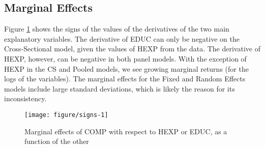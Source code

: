 \documentclass[12pt,a4paper]{article}\usepackage[]{graphicx}\usepackage[]{color}
\makeatletter
\def\maxwidth{ %
  \ifdim\Gin@nat@width>\linewidth
    \linewidth
  \else
    \Gin@nat@width
  \fi
}
\newenvironment{kframe}{%
 \def\at@end@of@kframe{}%
 \ifinner\ifhmode%
  \def\at@end@of@kframe{\end{minipage}}%
  \begin{minipage}{\columnwidth}%
 \fi\fi%
 \def\FrameCommand##1{\hskip\@totalleftmargin \hskip-\fboxsep
 \colorbox{shadecolor}{##1}\hskip-\fboxsep
     \hskip-\linewidth \hskip-\@totalleftmargin \hskip\columnwidth}%
 \MakeFramed {\advance\hsize-\width
   \@totalleftmargin\z@ \linewidth\hsize
   \@setminipage}}%
 {\par\unskip\endMakeFramed%
 \at@end@of@kframe}
\newenvironment{knitrout}{}{} %
\makeatother
\begin{document}
\subsection{Marginal Effects}
Figure \ref{fig:signs} shows the signs of the values of the derivatives of the two main explanatory variables. The derivative of EDUC can only be negative on the Cross-Sectional model, given the values of HEXP from the data. The derivative of HEXP, however, can be negative in both panel models. With the exception of HEXP in the CS and Pooled models, we see growing marginal returns (for the logs of the variables). The marginal effects for the Fixed and Random Effects models include large standard deviations, which is likely the reason for its inconsistency.
\begin{knitrout}
\color{fgcolor}\begin{kframe}


{\ttfamily\noindent\color{warningcolor}{\#\# Warning: Removed 300 rows containing missing values (geom\_point).}}

{\ttfamily\noindent\color{warningcolor}{\#\# Warning: Removed 300 rows containing missing values (geom\_path).}}\end{kframe}\begin{figure}
\texttt{[image: figure/signs-1]} \caption[Marginal effects of COMP with respect to HEXP or EDUC, as a function of the other]{Marginal effects of COMP with respect to HEXP or EDUC, as a function of the other}\label{fig:signs}
\end{figure}


\end{knitrout}
\end{document}
